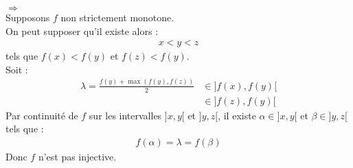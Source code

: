 \documentclass[../main.tex]{subfiles}
\begin{document}
$\boxed{\Rightarrow}$ \\
Supposons $f$ non strictement monotone. \\
On peut supposer qu'il existe alors : 
\begin{align*}
    x < y < z
\end{align*}
tels que $f(x) < f(y)$ et $f(z) < f(y)$. \\
Soit :
\begin{align*}
    \lambda = \frac{f(y) + \max(f(y), f(z))}{2} &\in ]f(x), f(y)[ \\
    &\in ]f(z), f(y)[
\end{align*}
Par continuité de $f$ sur les intervalles $]x, y[$ et $]y, z[$, il existe $\alpha \in ]x, y[$ et $\beta \in ]y, z[$ tels que : 
\begin{align*}
    f(\alpha) = \lambda = f(\beta)
\end{align*}
Donc $f$ n'est pas injective. 
\end{document}
